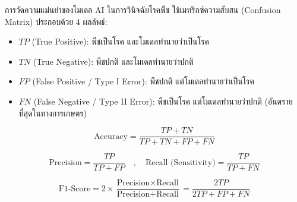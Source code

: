 การวัดความแม่นยำของโมเดล AI ในการวินิจฉัยโรคพืช ใช้เมทริกซ์ความสับสน (Confusion Matrix) ประกอบด้วย 4 ผลลัพธ์:
\begin{itemize}
    \item $TP$ (True Positive): พืชเป็นโรค และโมเดลทำนายว่าเป็นโรค 
    \item $TN$ (True Negative): พืชปกติ และโมเดลทำนายว่าปกติ
    \item $FP$ (False Positive / Type I Error): พืชปกติ แต่โมเดลทำนายว่าเป็นโรค
    \item $FN$ (False Negative / Type II Error): พืชเป็นโรค แต่โมเดลทำนายว่าปกติ (อันตรายที่สุดในทางการเกษตร) 
\end{itemize}

\begin{equation}
\text{Accuracy} = \frac{TP + TN}{TP + TN + FP + FN}
\end{equation}

\begin{equation}
\text{Precision} = \frac{TP}{TP + FP} \quad , \quad \text{Recall (Sensitivity)} = \frac{TP}{TP + FN}
\end{equation}

\begin{equation}
\text{F1-Score} = 2 \times \frac{\text{Precision} \times \text{Recall}}{\text{Precision} + \text{Recall}} = \frac{2 TP}{2 TP + FP + FN}
\end{equation}

